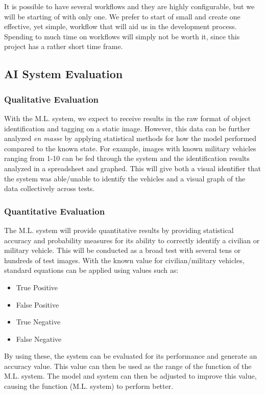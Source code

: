 \documentclass[12pt,twoside]{article}
\begin{document}
It is possible to have several workflows and they are highly configurable, but we will be starting of with only one. We prefer to start of small and create one effective, yet simple, workflow that will aid us in the development process. Spending to much time on workflows will simply not be worth it, since this project has a rather short time frame.

\subsection{AI System Evaluation}
\subsubsection{Qualitative Evaluation}
With the M.L. system, we expect to receive results in the raw format of object identification and tagging on a static image. However, this data can be further analyzed \textit{en masse} by applying statistical methods for how the model performed compared to the known state. For example, images with known military vehicles ranging from 1-10 can be fed through the system and the identification results analyzed in a spreadsheet and graphed. This will give both a visual identifier that the system was able/unable to identify the vehicles and a visual graph of the data collectively across tests.

\subsubsection{Quantitative Evaluation}
The M.L. system will provide quantitative results by providing statistical accuracy and probability measures for its ability to correctly identify a civilian or military vehicle. This will be conducted as a broad test with several tens or hundreds of test images. With the known value for civilian/military vehicles, standard equations can be applied using values such as:

\begin{itemize}
    \itemsep0em
    \item True Positive
    \item False Positive
    \item True Negative
    \item False Negative
\end{itemize}

By using these, the system can be evaluated for its performance and generate an accuracy value. This value can then be used as the range of the function of the M.L. system. The model and system can then be adjusted to improve this value, causing the function (M.L. system) to perform better.
\end{document}
